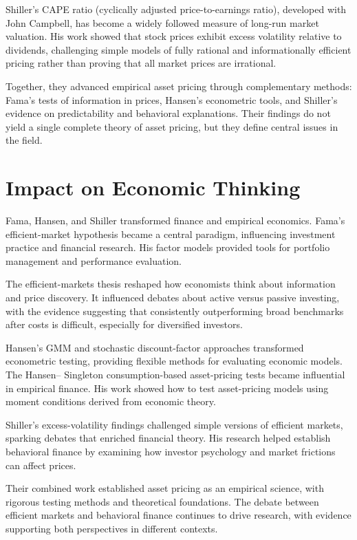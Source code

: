 Shiller's CAPE ratio (cyclically adjusted price-to-earnings ratio), developed
with John Campbell, has become a widely followed measure of long-run market
valuation. His work showed that stock prices exhibit excess volatility relative
to dividends, challenging simple models of fully rational and informationally
efficient pricing rather than proving that all market prices are irrational.

Together, they advanced empirical asset pricing through complementary methods:
Fama's tests of information in prices, Hansen's econometric tools, and Shiller's
evidence on predictability and behavioral explanations. Their findings do not
yield a single complete theory of asset pricing, but they define central issues
in the field.

\section{Impact on Economic Thinking}
Fama, Hansen, and Shiller transformed finance and empirical economics. Fama's
efficient-market hypothesis became a central paradigm, influencing investment
practice and financial research. His factor models provided tools for portfolio
management and performance evaluation.

The efficient-markets thesis reshaped how economists think about information and
price discovery. It influenced debates about active versus passive investing,
with the evidence suggesting that consistently outperforming broad benchmarks
after costs is difficult, especially for diversified investors.

Hansen's GMM and stochastic discount-factor approaches transformed econometric
testing, providing flexible methods for evaluating economic models. The Hansen--
Singleton consumption-based asset-pricing tests became influential in empirical
finance. His work showed how to test asset-pricing models using moment conditions
derived from economic theory.

Shiller's excess-volatility findings challenged simple versions of efficient
markets, sparking debates that enriched financial theory. His research helped
establish behavioral finance by examining how investor psychology and market
frictions can affect prices.

Their combined work established asset pricing as an empirical science, with
rigorous testing methods and theoretical foundations. The debate between
efficient markets and behavioral finance continues to drive research, with
evidence supporting both perspectives in different contexts.

